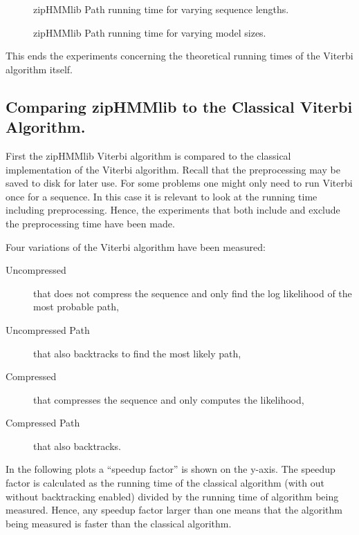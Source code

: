 \begin{figure}
  \centering
  
  \caption{zipHMMlib Path running time for varying sequence lengths.}
  \label{fig:assymptotic_viterbi_path_n}
\end{figure}

\begin{figure}
  \centering
  
  \caption{zipHMMlib Path running time for varying model sizes.}
  \label{fig:assymptotic_viterbi_path_k}
\end{figure}

This ends the experiments concerning the theoretical running times of the
Viterbi algorithm itself.

\subsection{Comparing zipHMMlib to the Classical Viterbi Algorithm.}

First the zipHMMlib Viterbi algorithm is compared to the classical
implementation of the Viterbi algorithm. Recall that the preprocessing may be
saved to disk for later use. For some problems one might only need to run
Viterbi once for a sequence. In this case it is relevant to look at the running time
including preprocessing. Hence, the experiments that both include and exclude
the preprocessing time have been made.

Four variations of the Viterbi algorithm have been measured:
\begin{description}
\item[Uncompressed] that does not compress the sequence and only find the log
  likelihood of the most probable path,
\item[Uncompressed Path] that also backtracks to find the most likely path,
\item[Compressed] that compresses the sequence and only computes the
  likelihood,
\item[Compressed Path] that also backtracks.
\end{description}

In the following plots a ``speedup factor'' is shown on the y-axis. The speedup
factor is calculated as the running time of the classical algorithm (with out
without backtracking enabled) divided by the running time of algorithm being
measured. Hence, any speedup factor larger than one means that the algorithm
being measured is faster than the classical algorithm.

